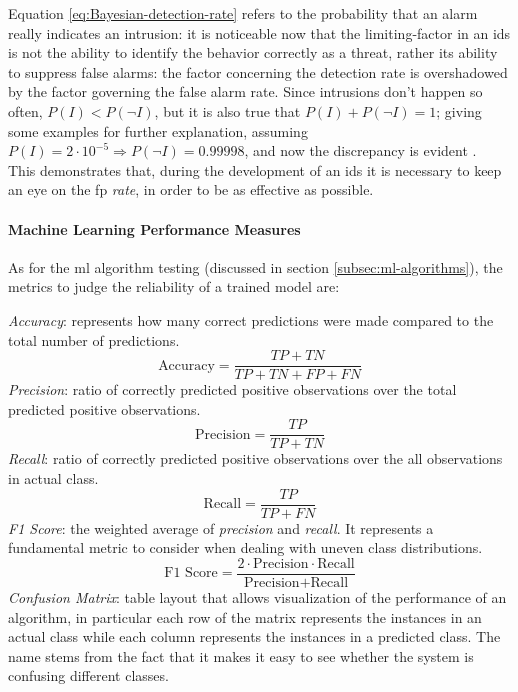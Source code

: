 Equation \ref{eq:Bayesian-detection-rate} refers to the probability that an alarm really indicates an intrusion: it is noticeable now that the limiting-factor in an \gls{ids} is not the ability to identify the behavior correctly as a threat, rather its ability to suppress false alarms: the factor concerning the detection rate is overshadowed by the factor governing the false alarm rate. Since intrusions don't happen so often, $P(I)<P(\neg I)$, but it is also true that $P(I)+P(\neg I)=1$; giving some examples for further explanation, assuming $P(I)=2\cdot 10^{-5}\Rightarrow P(\neg I)=0.99998$, and now the discrepancy is evident \cite{Axelsson2000}. \\ This demonstrates that, during the development of an \gls{ids} it is necessary to keep an eye on the \gls{fp} \textit{rate}, in order to be as effective as possible.

\paragraph{Machine Learning Performance Measures} As for the \gls{ml} algorithm testing (discussed in section \ref{subsec:ml-algorithms}), the metrics to judge the reliability of a trained model are:

\begin{itemize}
    \itemAR \textit{Accuracy}: represents how many correct predictions were made compared to the total number of predictions.
    \begin{equation}
        \text{Accuracy}=\frac{TP+TN}{TP+TN+FP+FN}
    \end{equation}
    \itemAR \textit{Precision}: ratio of correctly predicted positive observations over the total predicted positive observations.
    \begin{equation}
        \text{Precision}=\frac{TP}{TP+TN}
    \end{equation}
    \itemAR \textit{Recall}: ratio of correctly predicted positive observations over the all observations in actual class.
    \begin{equation}
        \text{Recall}=\frac{TP}{TP+FN}
    \end{equation}
    \itemAR \textit{F1 Score}: the weighted average of \textit{precision} and \textit{recall}. It represents a fundamental metric to consider when dealing with uneven class distributions.
    \begin{equation}
        \text{F1 Score}=\frac{2\cdot \text{Precision}\cdot \text{Recall}}{\text{Precision}+ \text{Recall}}
    \end{equation}
    \itemAR \textit{Confusion Matrix}: table layout that allows visualization of the performance of an algorithm, in particular each row of the matrix represents the instances in an actual class while each column represents the instances in a predicted class. The name stems from the fact that it makes it easy to see whether the system is confusing different classes.
\end{itemize}

